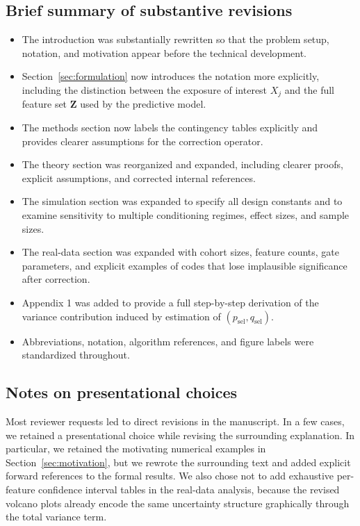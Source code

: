 \documentclass[onecolumn,11pt]{IEEEtran}
\begin{document}
\subsection*{Brief summary of substantive revisions}

\begin{itemize}
\item The introduction was substantially rewritten so that the problem setup, notation, and motivation appear before the technical development.
\item Section~\ref{sec:formulation} now introduces the notation more explicitly, including the distinction between the exposure of interest $X_j$ and the full feature set $\mathbf{Z}$ used by the predictive model.
\item The methods section now labels the contingency tables explicitly and provides clearer assumptions for the correction operator.
\item The theory section was reorganized and expanded, including clearer proofs, explicit assumptions, and corrected internal references.
\item The simulation section was expanded to specify all design constants and to examine sensitivity to multiple conditioning regimes, effect sizes, and sample sizes.
\item The real-data section was expanded with cohort sizes, feature counts, gate parameters, and explicit examples of codes that lose implausible significance after correction.
\item Appendix 1 was added to provide a full step-by-step derivation of the variance contribution induced by estimation of $(p_{\mathrm{sel}}, q_{\mathrm{sel}})$.
\item Abbreviations, notation, algorithm references, and figure labels were standardized throughout.
\end{itemize}

\subsection*{Notes on presentational choices}

Most reviewer requests led to direct revisions in the manuscript. In a few cases, we retained a presentational choice while revising the surrounding explanation. In particular, we retained the motivating numerical examples in Section~\ref{sec:motivation}, but we rewrote the surrounding text and added explicit forward references to the formal results. We also chose not to add exhaustive per-feature confidence interval tables in the real-data analysis, because the revised volcano plots already encode the same uncertainty structure graphically through the total variance term.
\end{document}
